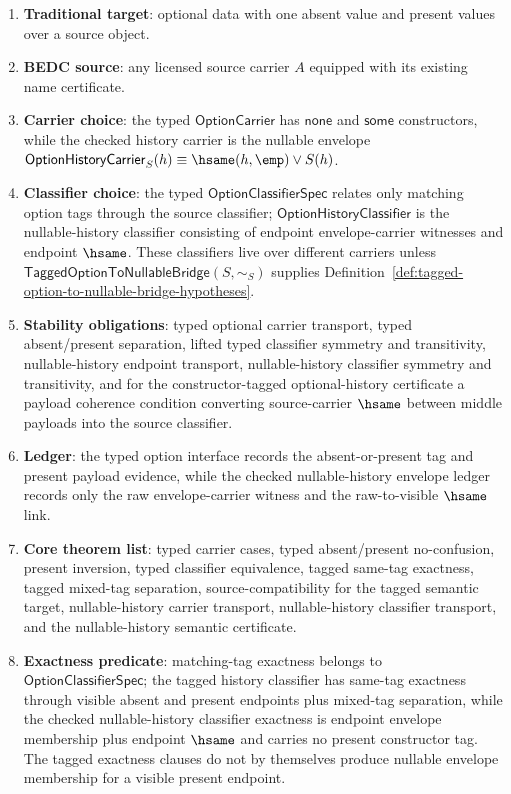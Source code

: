\begin{enumerate}
  \item \textbf{Traditional target}: optional data with one absent value and present values over a source object.
  \item \textbf{BEDC source}: any licensed source carrier $A$ equipped with its existing name certificate.
  \item \textbf{Carrier choice}: the typed $\mathsf{OptionCarrier}$ has $\mathsf{none}$ and $\mathsf{some}$ constructors, while the checked history carrier is the nullable envelope $\mathsf{OptionHistoryCarrier}_S(h)\equiv \hsame(h,\emp)\lor S(h)$.
  \item \textbf{Classifier choice}: the typed $\mathsf{OptionClassifierSpec}$ relates only matching option tags through the source classifier; $\mathsf{OptionHistoryClassifier}$ is the nullable-history classifier consisting of endpoint envelope-carrier witnesses and endpoint $\hsame$. These classifiers live over different carriers unless $\mathsf{TaggedOptionToNullableBridge}(S,\sim_S)$ supplies Definition~\ref{def:tagged-option-to-nullable-bridge-hypotheses}.
  \item \textbf{Stability obligations}: typed optional carrier transport, typed absent/present separation, lifted typed classifier symmetry and transitivity, nullable-history endpoint transport, nullable-history classifier symmetry and transitivity, and for the constructor-tagged optional-history certificate a payload coherence condition converting source-carrier $\hsame$ between middle payloads into the source classifier.
  \item \textbf{Ledger}: the typed option interface records the absent-or-present tag and present payload evidence, while the checked nullable-history envelope ledger records only the raw envelope-carrier witness and the raw-to-visible $\hsame$ link.
  \item \textbf{Core theorem list}: typed carrier cases, typed absent/present no-confusion, present inversion, typed classifier equivalence, tagged same-tag exactness, tagged mixed-tag separation, source-compatibility for the tagged semantic target, nullable-history carrier transport, nullable-history classifier transport, and the nullable-history semantic certificate.
  \item \textbf{Exactness predicate}: matching-tag exactness belongs to $\mathsf{OptionClassifierSpec}$; the tagged history classifier has same-tag exactness through visible absent and present endpoints plus mixed-tag separation, while the checked nullable-history classifier exactness is endpoint envelope membership plus endpoint $\hsame$ and carries no present constructor tag. The tagged exactness clauses do not by themselves produce nullable envelope membership for a visible present endpoint.

\end{enumerate}
